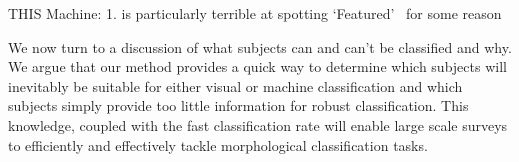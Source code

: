 \documentclass[twocolumn]{aastex6}
\newcommand{\feat}{`Featured'}
\begin{document}
THIS Machine: 1. is particularly terrible at spotting \feat~ for some reason

We now turn to a discussion of what subjects can and can't be classified and why. 
We argue that our method provides a quick way to determine which subjects will
inevitably be suitable for either visual or machine classification and which subjects
simply provide too little information for robust classification. This knowledge, coupled
with the fast classification rate will enable large scale surveys to efficiently and effectively
tackle morphological classification tasks. 

\end{document}
